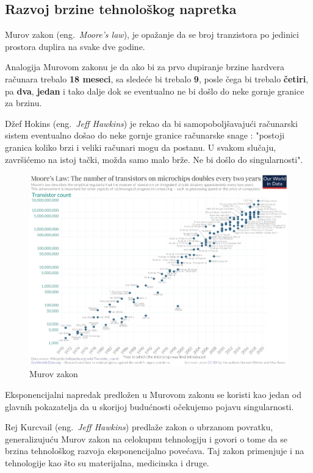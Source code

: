 \documentclass[a4paper]{article}
\begin{document}
\subsection{Razvoj brzine tehnološkog napretka}

Murov zakon (eng.~{\em Moore's law}), je opažanje da se broj tranzistora po jedinici prostora duplira na svake dve godine. 

Analogija Murovom zakonu je da ako bi za prvo dupiranje brzine hardvera računara trebalo \textbf{18 meseci}, sa sledeće bi trebalo \textbf{9}, posle čega bi trebalo \textbf{četiri}, pa \textbf{dva}, \textbf{jedan} i tako dalje dok se eventualno ne bi došlo do neke gornje granice za brzinu. \cite{mog-4}

Džef Hokins (eng.~{\em Jeff Hawkins}) je rekao da bi samopoboljšavajući računarski sistem eventualno došao do neke gornje granice računarske snage : "postoji granica koliko brzi i veliki računari mogu da postanu. U svakom slučaju, završićemo na istoj tački, možda samo malo brže. Ne bi došlo do singularnosti". \cite{mog-5}

\begin{figure}[h!]
\begin{center}
\includegraphics[scale=0.35]{moore.png}
\end{center}
\caption{Murov zakon}
\label{fig:frog}
\end{figure}

Eksponencijalni napredak predložen u Murovom zakonu se koristi kao jedan od glavnih pokazatelja da u skorijoj budućnosti očekujemo pojavu singularnosti.

Rej Kurcvail (eng.~{\em Jeff Hawkins}) predlaže zakon o ubrzanom povratku, generalizujuću Murov zakon na celokupnu tehnologiju i govori o tome da se brzina tehnološkog razvoja eksponencijalno povećava. Taj zakon primenjuje i na tehnologije kao što su materijalna, medicinska i druge. \cite{mog-6}
\end{document}
